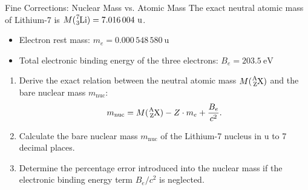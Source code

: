 \begin{exercise}{Fine Corrections: Nuclear Mass vs. Atomic Mass}
The exact neutral atomic mass of Lithium-7 is $M(\ce{^{7}_{3}Li}) = 7.016\,004\ \mathrm{u}$.
\begin{itemize}[itemsep=1pt]
  \item Electron rest mass: $m_e = 0.000\,548\,580\ \mathrm{u}$
  \item Total electronic binding energy of the three electrons: $B_e = 203.5\ \mathrm{eV}$
\end{itemize}
\begin{enumerate}[leftmargin=1.5em,itemsep=2pt]
  \item Derive the exact relation between the neutral atomic mass $M(\ce{^{A}_{Z}X})$ and the bare nuclear mass $m_{\text{nuc}}$:
  \[
  m_{\text{nuc}} = M(\ce{^{A}_{Z}X}) - Z \cdot m_e + \frac{B_e}{c^2}.
  \]
  \item Calculate the bare nuclear mass $m_{\text{nuc}}$ of the Lithium-7 nucleus in $\mathrm{u}$ to 7 decimal places.
  \item Determine the percentage error introduced into the nuclear mass if the electronic binding energy term $B_e / c^2$ is neglected.
\end{enumerate}
\end{exercise}

\begin{tabletworkspace}[5.0cm]
\end{tabletworkspace}


